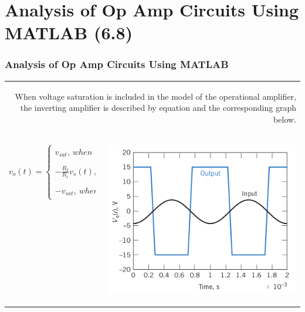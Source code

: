 \documentclass[aspectratio=169]{beamer}
\begin{document}
\section{Analysis of Op Amp Circuits Using MATLAB (6.8)}
\begin{frame}[fragile]
\frametitle{Analysis of Op Amp Circuits Using MATLAB}
\begin{tabular}{r}

 \begin{columns}
		\begin{column}{1\textwidth}
When voltage saturation is included in the model of the
operational amplifier, the inverting amplifier is described by equation and the corresponding graph below.
		\end{column}
	\end{columns}\\

	\begin{columns}
	  \begin{column}{.5\textwidth}  %
	    $$
	    v_{o}(t)=
	    \begin{cases}
	    v_{sat}, \ when \ -\frac{R_{2}}{R_{1}}v_{s}(t)>v_{sat} \\
	    \\
	    -\frac{R_{2}}{R_{1}}v_{s}(t), \ when \ - v_{sat} \leq-\frac{R_{2}}{R_{1}}v_{s}(t) \leq v_{sat}\\
	    \\
	    -v_{sat}, \ when \ -\frac{R_{2}}{R_{1}}v_{s}(t)<- v_{sat}
	    \end{cases}
	    $$

	      \end{column}	
	      \begin{column}{.5\textwidth}  %
		\begin{center}
		  \includegraphics[height=.55\textwidth]{figura29.png}	
		\end{center}
	      \end{column}	
		

\end{columns}
\end{tabular}
\end{frame}
\end{document}
